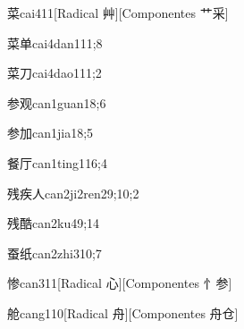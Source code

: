 \begin{verbete}{菜}{cai4}{11}[Radical 艸][Componentes ⺾采]
\end{verbete}

\begin{verbete}{菜单}{cai4dan1}{11;8}
\end{verbete}

\begin{verbete}{菜刀}{cai4dao1}{11;2}
\end{verbete}

\begin{verbete}{参观}{can1guan1}{8;6}
\end{verbete}

\begin{verbete}{参加}{can1jia1}{8;5}
\end{verbete}

\begin{verbete}{餐厅}{can1ting1}{16;4}
\end{verbete}

\begin{verbete}{残疾人}{can2ji2ren2}{9;10;2}
\end{verbete}

\begin{verbete}{残酷}{can2ku4}{9;14}
\end{verbete}

\begin{verbete}{蚕纸}{can2zhi3}{10;7}
\end{verbete}

\begin{verbete}{惨}{can3}{11}[Radical 心][Componentes ⺖参]
\end{verbete}

\begin{verbete}{舱}{cang1}{10}[Radical ⾈][Componentes ⾈仓]
\end{verbete}

